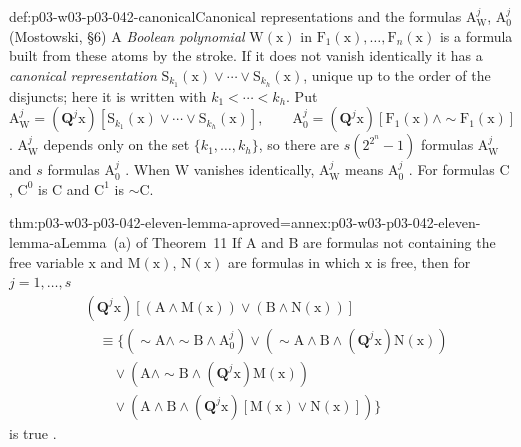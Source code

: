 \begin{hbdefinition}{def:p03-w03-p03-042-canonical}{Canonical representations and the formulas \(\mathrm A^j_{\mathrm W}\), \(\mathrm A^j_0\) (Mostowski, \S6)}
A \emph{Boolean polynomial} \(\mathrm W(\mathrm x)\) in \(\mathrm
F_1(\mathrm x),\ldots,\mathrm F_n(\mathrm x)\) is a formula built from
these atoms by the stroke.  If it does not vanish identically it has a
\emph{canonical representation} \(\mathrm S_{k_1}(\mathrm x)\vee\cdots
\vee\mathrm S_{k_h}(\mathrm x)\), unique up to the order of the
disjuncts; here it is written with \(k_1<\cdots<k_h\).  Put
\[
 \mathrm A^j_{\mathrm W}=(\mathbf Q^j\mathrm x)[\mathrm S_{k_1}(\mathrm
 x)\vee\cdots\vee\mathrm S_{k_h}(\mathrm x)],\qquad
 \mathrm A^j_0=(\mathbf Q^j\mathrm x)[\mathrm F_1(\mathrm x)\wedge
 {\sim}\mathrm F_1(\mathrm x)]
\]
\cite[p.~32]{Mostowski1957}.  \(\mathrm A^j_{\mathrm W}\) depends only on
the set \(\{k_1,\ldots,k_h\}\), so there are \(s(2^{2^n}-1)\) formulas
\(\mathrm A^j_{\mathrm W}\) and \(s\) formulas \(\mathrm A^j_0\)
\cite[p.~33]{Mostowski1957}.  When \(\mathrm W\) vanishes identically,
\(\mathrm A^j_{\mathrm W}\) means \(\mathrm A^j_0\)
\cite[p.~33]{Mostowski1957}.  For formulas \(\mathrm C\),
\(\mathrm C^0\) is \(\mathrm C\) and \(\mathrm C^1\) is \({\sim}\mathrm
C\).
\end{hbdefinition}

\begin{hblemma}{thm:p03-w03-p03-042-eleven-lemma-a}{proved=annex:p03-w03-p03-042-eleven-lemma-a}{Lemma~(a) of Theorem~11}
If \(\mathrm A\) and \(\mathrm B\) are formulas not containing the free
variable \(\mathrm x\) and \(\mathrm M(\mathrm x)\), \(\mathrm
N(\mathrm x)\) are formulas in which \(\mathrm x\) is free, then for
\(j=1,\ldots,s\)
\[
 \begin{aligned}
 &(\mathbf Q^j\mathrm x)[(\mathrm A\wedge\mathrm M(\mathrm x))\vee
 (\mathrm B\wedge\mathrm N(\mathrm x))]\\
 &\quad\equiv\{({\sim}\mathrm A\wedge{\sim}\mathrm B\wedge\mathrm A^j_0)
 \vee({\sim}\mathrm A\wedge\mathrm B\wedge(\mathbf Q^j\mathrm x)\mathrm
 N(\mathrm x))\\
 &\qquad\vee(\mathrm A\wedge{\sim}\mathrm B\wedge(\mathbf Q^j\mathrm x)
 \mathrm M(\mathrm x))\\
 &\qquad\vee(\mathrm A\wedge\mathrm B\wedge(\mathbf Q^j\mathrm x)
 [\mathrm M(\mathrm x)\vee\mathrm N(\mathrm x)])\}
 \end{aligned}
\]
is true \cite[p.~32]{Mostowski1957}.
\end{hblemma}

